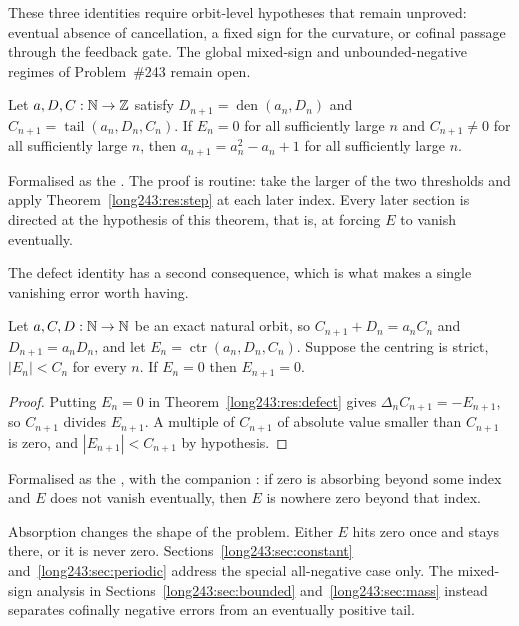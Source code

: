 \documentclass[11pt]{article}
\newcommand{\den}{\operatorname{den}}
\newcommand{\tail}{\operatorname{tail}}
\newcommand{\ctr}{\operatorname{ctr}}
\begin{document}
These three identities require orbit-level hypotheses that remain unproved:
eventual absence of cancellation, a fixed sign for the curvature, or cofinal
passage through the feedback gate.  The global mixed-sign and
unbounded-negative regimes of Problem~\#243 remain open.

\begin{theorem}\label{long243:res:eventual}
Let $a,D,C:\mathbb{N}\to\mathbb{Z}$ satisfy $D_{n+1}=\den(a_n,D_n)$ and
$C_{n+1}=\tail(a_n,D_n,C_n)$.  If $E_n=0$ for all sufficiently large $n$ and
$C_{n+1}\ne0$ for all sufficiently large $n$, then $a_{n+1}=a_n^{2}-a_n+1$ for
all sufficiently large $n$.
\end{theorem}

\noindent Formalised as the
.  The proof is routine: take the larger of the two
thresholds and apply Theorem~\ref{long243:res:step} at each later index.  Every later
section is directed at the hypothesis of this theorem, that is, at forcing $E$
to vanish eventually.

The defect identity has a second consequence, which is what makes a single
vanishing error worth having.

\begin{theorem}\label{long243:res:absorb}
Let $a,C,D:\mathbb{N}\to\mathbb{N}$ be an exact natural orbit, so
$C_{n+1}+D_n=a_nC_n$ and $D_{n+1}=a_nD_n$, and let
$E_n=\ctr(a_n,D_n,C_n)$.  Suppose the centring is strict, $|E_n|<C_n$ for
every $n$.  If $E_n=0$ then $E_{n+1}=0$.
\end{theorem}

\begin{proof}
Putting $E_n=0$ in Theorem~\ref{long243:res:defect} gives
$\Delta_n C_{n+1}=-E_{n+1}$, so $C_{n+1}$ divides $E_{n+1}$.  A multiple of
$C_{n+1}$ of absolute value smaller than $C_{n+1}$ is zero, and
$|E_{n+1}|<C_{n+1}$ by hypothesis.
\end{proof}

\noindent Formalised as the
, with the companion
: if zero is absorbing beyond some index and $E$ does not vanish
eventually, then $E$ is nowhere zero beyond that index.

Absorption changes the shape of the problem.  Either $E$ hits zero once and
stays there, or it is never zero.  Sections~\ref{long243:sec:constant}
and~\ref{long243:sec:periodic} address the special all-negative case only.  The
mixed-sign analysis
in Sections~\ref{long243:sec:bounded} and~\ref{long243:sec:mass} instead separates cofinally
negative errors from an eventually positive tail.
\end{document}
